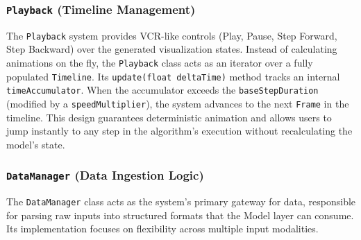 \subsubsection{\texttt{Playback} (Timeline Management)}
The \texttt{Playback} system provides VCR-like controls (Play, Pause, Step Forward, Step Backward) over the generated visualization states.
Instead of calculating animations on the fly, the \texttt{Playback} class acts as an iterator over a fully populated \texttt{Timeline}. Its \texttt{update(float deltaTime)} method tracks an internal \texttt{timeAccumulator}. When the accumulator exceeds the \texttt{baseStepDuration} (modified by a \texttt{speedMultiplier}), the system advances to the next \texttt{Frame} in the timeline. This design guarantees deterministic animation and allows users to jump instantly to any step in the algorithm's execution without recalculating the model's state.

\subsubsection{\texttt{DataManager} (Data Ingestion Logic)}
The \texttt{DataManager} class acts as the system's primary gateway for data, responsible for parsing raw inputs into structured formats that the Model layer can consume. Its implementation focuses on flexibility across multiple input modalities.

